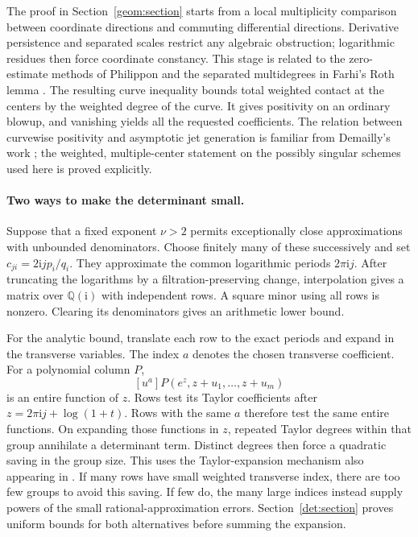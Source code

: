 \documentclass[11pt]{article}
\newcommand{\QQ}{\mathbb Q}
\newcommand{\ii}{\mathrm i}
\theoremstyle{definition}
\theoremstyle{remark}
\numberwithin{equation}{section}
\begin{document}
The proof in Section~\ref{geom:section} starts from a local multiplicity
comparison between coordinate directions and commuting differential
directions. Derivative persistence and separated scales restrict any
algebraic obstruction; logarithmic residues then force coordinate
constancy. This stage is related to the zero-estimate methods of
Philippon \cite{philippon1986} and the separated multidegrees in
Farhi's Roth lemma \cite[Section~5.2]{farhi2006}. The resulting curve
inequality bounds total weighted contact at the centers by the weighted
degree of the curve. It gives positivity on an ordinary blowup, and vanishing yields
all the requested coefficients. The relation between curvewise positivity
and asymptotic jet generation is familiar from Demailly's work
\cite[Section~6]{demailly1992}; the weighted, multiple-center statement
on the possibly singular schemes used here is proved explicitly.

\paragraph{Two ways to make the determinant small.}
Suppose that a fixed exponent \(\nu>2\) permits exceptionally close
approximations with unbounded denominators. Choose finitely many of these
successively and set \(c_{ji}=2\ii j p_i/q_i\). They approximate
the common logarithmic periods \(2\pi\ii j\). After truncating the
logarithms by a filtration-preserving change, interpolation gives a
matrix over \(\QQ(\ii)\) with independent rows. A square minor using
all rows is nonzero. Clearing its denominators gives an arithmetic
lower bound.

For the analytic bound, translate each row to the exact periods and
expand in the transverse variables. The index \(a\) denotes the chosen
transverse coefficient. For a polynomial column \(P\),
\[
 [u^a]P(e^z,z+u_1,\ldots,z+u_m)
\]
is an entire function of \(z\). Rows test its Taylor coefficients after
\(z=2\pi\ii j+\log(1+t)\). Rows with the same \(a\) therefore test
the same entire functions. On expanding those functions in \(z\),
repeated Taylor degrees within that group annihilate a
determinant term. Distinct degrees then force a quadratic saving in the
group size. This uses the Taylor-expansion mechanism also appearing in
\cite[Theorem~1]{laurent2000}. If many rows have small weighted
transverse index, there are too few groups to avoid this saving. If
few do, the many large indices instead supply powers of the small
rational-approximation errors. Section~\ref{det:section} proves uniform
bounds for both alternatives before summing the expansion.
\end{document}
